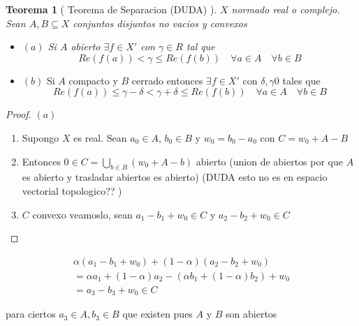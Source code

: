 \documentclass[10pt]{extarticle}
\theoremstyle{break}
\newtheorem{theorem}{Teorema}[section]
\theoremstyle{definition}
\begin{document}
\begin{theorem} [ Teorema de Separacion (DUDA) ] 
\label{teo-sep}
	$X$ normado real o complejo. Sean $A,B\subseteq X$ conjuntos disjuntos no vacios y convexos
	\begin{itemize}
		\item $(a)$ Si $A$ abierto $\exists f\in X'$ con $\gamma \in R$ tal que 
$$Re(f(a))<\gamma\leq Re(f(b))\quad\forall a\in A\quad \forall b\in B$$
	\end{itemize}
\end{theorem}


\begin{itemize}
\item
$(b)$ Si $A$ compacto y $B$ cerrado entonces $\exists f\in X'$ con $\delta,\gamma0$ tales que
$$Re(f(a))\leq \gamma-\delta<\gamma+\delta\leq Re(f(b))\quad\forall a\in A\quad\forall b\in B$$
\end{itemize}

\begin{proof}
$(a)$
\begin{enumerate}
\item
Supongo $X$ es real. Sean $a_{0}\in A$, $b_{0}\in B$ y $w_{0}=b_{0}-a_{0}$ con $C=w_{0}+A-B$
\item
Entonces $0\in C=\bigcup_{b\in B}(w_{0}+A-b)$ abierto (union de abiertos por que $A$ es abierto y trasladar abiertos es abierto) (DUDA esto no es en espacio vectorial topologico?? )
\item
$C$ convexo veamoslo, sean $a_{1}-b_{1}+w_{0}\in C$ y $a_{2}-b_{2}+w_{0}\in C$
\end{enumerate}
\end{proof}



\begin{align}&\alpha (a_{1}-b_{1}+w_{0})+(1-\alpha )(a_{2}-b_{2}+w_{0}) \\
&=\alpha a_{1}+(1-\alpha )a_{2} - (\alpha b_{1}+(1-\alpha )b_{2})+w_{0}& \\
&=a_{3}-b_{3}+w_{0}\in C\end{align}

para ciertos $a_{3}\in A,b_{3}\in B$ que existen pues $A$ y $B$ son abiertos
\end{document}
